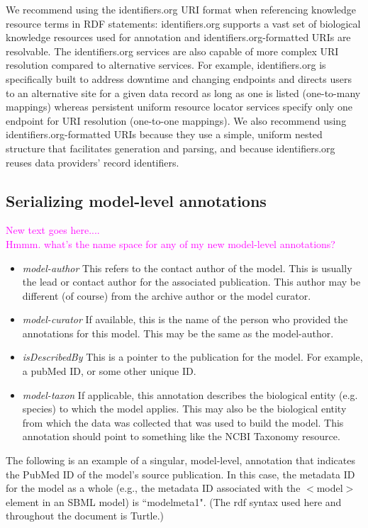 \documentclass[pdftex,rgb,dvipsnames,svgnames,hyperref,table]{report}
\begin{document}
We recommend using the identifiers.org URI format when referencing knowledge resource terms in RDF statements: identifiers.org supports a vast set of biological knowledge resources used for annotation and identifiers.org-formatted URIs are resolvable. The identifiers.org services are also capable of more complex URI resolution compared to alternative services. For example, identifiers.org is specifically built to address downtime and changing endpoints and directs users to an alternative site for a given data record as long as one is listed (one-to-many mappings) whereas persistent uniform resource locator services specify only one endpoint for URI resolution (one-to-one mappings). We also recommend using identifiers.org-formatted URIs because they use a simple, uniform nested structure that facilitates generation and parsing, and because identifiers.org reuses data providers’ record identifiers.

\subsection{Serializing model-level annotations}
\textcolor{magenta} {New text goes here....\\
Hmmm. what's the name space for any of my new model-level annotations?}

\begin{itemize}
    \item \emph {model-author} This refers to the contact author of the model. This is usually the lead or contact author for the associated publication. This author may be different (of course) from the archive author or the model curator. 
    \item \emph{model-curator} If available, this is the name of the person who provided the annotations for this model. This may be the same as the model-author. 
    \item \emph{isDescribedBy} This is a pointer to the publication for the model. For example, a pubMed ID, or some other unique ID.
    \item \emph{model-taxon} If applicable, this annotation describes the biological entity (e.g. species) to which the model applies. This may also be the biological entity from which the data was collected that was used to build the model. This annotation should point to something like the NCBI Taxonomy resource. 
\end{itemize}

The following is an example of a singular, model-level, annotation that indicates the PubMed ID of the model's source publication. In this case, the metadata ID for the model as a whole (e.g., the metadata ID associated with the $<$model$>$ element in an SBML model) is ``modelmeta1". (The rdf syntax used here and throughout the document is Turtle.) 
 
\end{document}
